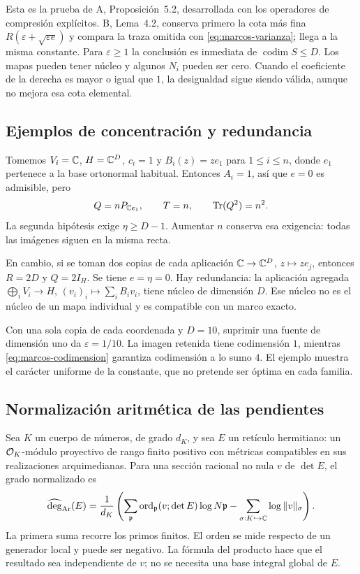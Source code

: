 Esta es la prueba de A, Proposición~5.2, desarrollada con los operadores
de compresión explícitos. B, Lema~4.2, conserva primero la cota más fina
$R(\varepsilon+\sqrt{\varepsilon e})$ y compara la traza omitida
con \eqref{eq:marcos-varianza}; llega a la misma constante.
Para $\varepsilon\ge1$ la conclusión es inmediata de
$\operatorname{codim}S\le D$. Los mapas pueden tener núcleo y algunos
$N_i$ pueden ser cero. Cuando el coeficiente de la derecha es mayor
o igual que $1$, la desigualdad sigue siendo válida, aunque no mejora
esa cota elemental.

\subsection{Ejemplos de concentración y redundancia}

Tomemos $V_i=\mathbb{C}$, $H=\mathbb{C}^D$, $c_i=1$ y $B_i(z)=ze_1$ para
$1\le i\le n$, donde $e_1$ pertenece a la base ortonormal habitual.
Entonces $A_i=1$, así que $e=0$ es admisible, pero
\[
 Q=nP_{\mathbb{C} e_1},\qquad T=n,\qquad
 \operatorname{Tr}(Q^2)=n^2.
\]
La segunda hipótesis exige $\eta\ge D-1$. Aumentar $n$ conserva
esa exigencia: todas las imágenes siguen en la misma recta.

En cambio, si se toman dos copias de cada aplicación
$\mathbb{C}\to\mathbb{C}^D$, $z\mapsto ze_j$, entonces $R=2D$ y $Q=2I_H$.
Se tiene $e=\eta=0$. Hay redundancia: la aplicación agregada
$\bigoplus_iV_i\to H$, $(v_i)_i\mapsto\sum_iB_iv_i$, tiene
núcleo de dimensión $D$. Ese núcleo no es el núcleo de un mapa
individual y es compatible con un marco exacto.

Con una sola copia de cada coordenada y $D=10$, suprimir una fuente
de dimensión uno da $\varepsilon=1/10$. La imagen retenida tiene
codimensión $1$, mientras \eqref{eq:marcos-codimension} garantiza
codimensión a lo sumo $4$. El ejemplo muestra el carácter uniforme
de la constante, que no pretende ser óptima en cada familia.

\subsection{Normalización aritmética de las pendientes}

Sea $K$ un cuerpo de números, de grado $d_K$, y sea $E$ un
retículo hermitiano: un $\mathcal{O}_K$-módulo proyectivo de rango finito positivo con
métricas compatibles en sus realizaciones arquimedianas. Para una
sección racional no nula $v$ de $\det E$, el grado normalizado es
\begin{equation}
 \widehat{\deg}_{\mathrm{Ar}}(E)=\frac1{d_K}
 \left(\sum_{\mathfrak p}\operatorname{ord}_{\mathfrak p}(v;\det E)
                 \log N\mathfrak p
       -\sum_{\sigma:K\hookrightarrow\mathbb{C}}\log\|v\|_\sigma\right).
 \label{eq:marcos-grado}
\end{equation}
La primera suma recorre los primos finitos. El orden se mide respecto
de un generador local y puede ser negativo. La fórmula del producto
hace que el resultado sea independiente de $v$; no se necesita una
base integral global de $E$.

